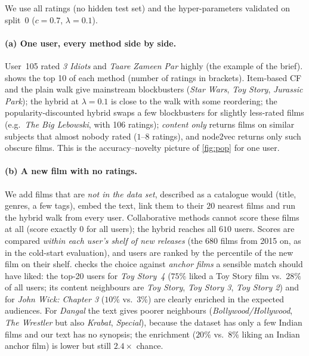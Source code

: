 We use all ratings (no hidden test set) and the hyper-parameters validated on split~0 ($c=0.7$, $\lambda=0.1$).

\paragraph{(a) One user, every method side by side.} User~105 rated \emph{3 Idiots} and \emph{Taare Zameen Par} highly (the example of the brief).  shows the top 10 of each method (number of ratings in brackets). Item-based CF and the plain walk give mainstream blockbusters (\emph{Star Wars}, \emph{Toy Story}, \emph{Jurassic Park}); the hybrid at $\lambda=0.1$ is close to the walk with some reordering; the popularity-discounted hybrid swaps a few blockbusters for slightly less-rated films (e.g.\ \emph{The Big Lebowski}, with 106 ratings); \emph{content only} returns films on similar subjects that almost nobody rated ($1$--$8$ ratings), and node2vec returns only such obscure films. This is the accuracy--novelty picture of \cref{fig:pop} for one user.

\begin{table}[H]\centering\tiny
\resizebox{\linewidth}{!}{}
\caption{Top-10 recommendations of each method for user 105 (in brackets: number of ratings of the film).}\label{tab:demo}\end{table}

\paragraph{(b) A new film with no ratings.} We add films that are \emph{not in the data set}, described as a catalogue would (title, genres, a few tags), embed the text, link them to their $20$ nearest films and run the hybrid walk from every user. Collaborative methods cannot score these films at all (score exactly $0$ for all users); the hybrid reaches all $610$ users. Scores are compared \emph{within each user's shelf of new releases} (the $680$ films from 2015 on, as in the cold-start evaluation), and users are ranked by the percentile of the new film on their shelf.  checks the choice against \emph{anchor films} a sensible match should have liked: the top-20 users for \emph{Toy Story~4} ($75\%$ liked a Toy Story film vs.\ $28\%$ of all users; its content neighbours are \emph{Toy Story}, \emph{Toy Story 3}, \emph{Toy Story 2}) and for \emph{John Wick: Chapter 3} ($10\%$ vs.\ $3\%$) are clearly enriched in the expected audiences. For \emph{Dangal} the text gives poorer neighbours (\emph{Bollywood/Hollywood}, \emph{The Wrestler} but also \emph{Krabat}, \emph{Special}), because the dataset has only a few Indian films and our text has no synopsis; the enrichment ($20\%$ vs.\ $8\%$ liking an Indian anchor film) is lower but still $2.4\times$ chance.

